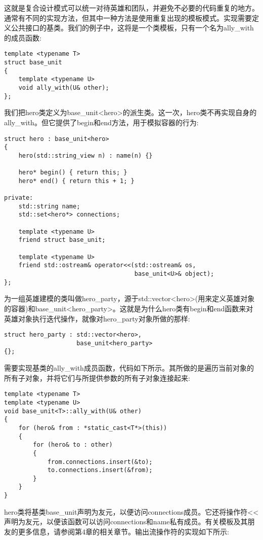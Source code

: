 这就是复合设计模式可以统一对待英雄和团队，并避免不必要的代码重复的地方。通常有不同的实现方法，但其中一种方法是使用重复出现的模板模式。实现需要定义公共接口的基类。我们的例子中，这将是一个类模板，只有一个名为ally\_with的成员函数:

\begin{lstlisting}[style=styleCXX]
template <typename T>
struct base_unit
{
	template <typename U>
	void ally_with(U& other);
};
\end{lstlisting}

我们把hero类定义为base\_unit<hero>的派生类。这一次，hero类不再实现自身的ally\_with。但它提供了begin和end方法，用于模拟容器的行为:

\begin{lstlisting}[style=styleCXX]
struct hero : base_unit<hero>
{
	hero(std::string_view n) : name(n) {}
	
	hero* begin() { return this; }
	hero* end() { return this + 1; }
	
private:
	std::string name;
	std::set<hero*> connections;
	
	template <typename U>
	friend struct base_unit;
	
	template <typename U>
	friend std::ostream& operator<<(std::ostream& os,
									base_unit<U>& object);
};
\end{lstlisting}

为一组英雄建模的类叫做hero\_party，源于std::vector<hero>(用来定义英雄对象的容器)和base\_unit<hero\_party>。这就是为什么hero类有begin和end函数来对英雄对象执行迭代操作，就像对hero\_party对象所做的那样:

\begin{lstlisting}[style=styleCXX]
struct hero_party : std::vector<hero>,
					base_unit<hero_party>
{};
\end{lstlisting}

需要实现基类的ally\_with成员函数，代码如下所示。其所做的是遍历当前对象的所有子对象，并将它们与所提供参数的所有子对象连接起来:

\begin{lstlisting}[style=styleCXX]
template <typename T>
template <typename U>
void base_unit<T>::ally_with(U& other)
{
	for (hero& from : *static_cast<T*>(this))
	{
		for (hero& to : other)
		{
			from.connections.insert(&to);
			to.connections.insert(&from);
		}
	}
}
\end{lstlisting}

hero类将基类base\_unit声明为友元，以便访问connections成员。它还将操作符<{}<声明为友元，以便该函数可以访问connections和name私有成员。有关模板及其朋友的更多信息，请参阅第4章的相关章节。输出流操作符的实现如下所示:


